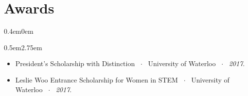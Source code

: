 \documentclass[oneside, 11pt]{memoir}
\newcommand{\entryProject}[4]{
  \begin{adjustwidth}{0.4em}{0em}%
  \textbf{#1}~$\cdot$~#2\sourceatright{\Date \small #3}%
  \begin{adjustwidth}{0.5em}{2.75em}
    \begin{flushleft}
      {
        \Merriweather \small
        #4
      }%
    \end{flushleft}
  \end{adjustwidth}
  \end{adjustwidth}
}
\newcommand{\entryList}[1]{
  \begin{adjustwidth}{0.4em}{0em}%
  \begin{adjustwidth}{0.5em}{2.75em}
    \begin{flushleft}
      {
        \Merriweather \small
        #1
      }%
    \end{flushleft}
  \end{adjustwidth}
  \end{adjustwidth}
}
\begin{document}

\section*{Awards}

\entryList{
  \begin{itemize}
    \item{
        President's Scholarship with Distinction ~$\cdot$~ University of Waterloo ~$\cdot$~ \emph{2017}.
    }
    \item{
        Leslie Woo Entrance Scholarship for Women in STEM ~$\cdot$~ University of Waterloo ~$\cdot$~ \emph{2017}.
    }
  \end{itemize}
}




%



\end{document}
